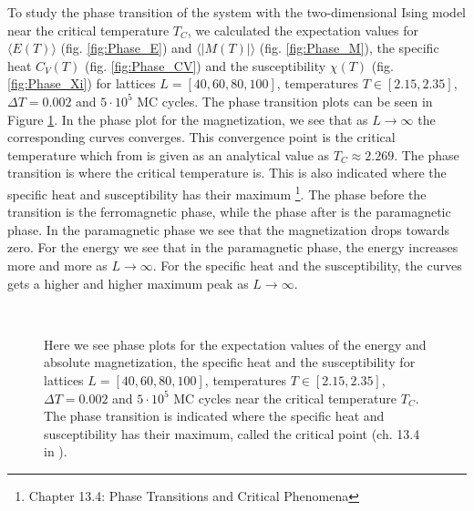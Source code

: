 \documentclass[12pt,a4paper,english]{article}
\begin{document}
To study the phase transition of the system with the two-dimensional Ising model near the critical temperature $T_C$, we calculated the expectation values for $\langle E(T)\rangle$ (fig. \ref{fig:Phase_E}) and $\langle |M(T)|\rangle$ (fig. \ref{fig:Phase_M}), the specific heat $C_V(T)$ (fig. \ref{fig:Phase_CV}) and the susceptibility $\chi(T)$ (fig. \ref{fig:Phase_Xi}) for lattices $L=[40,60,80,100]$, temperatures $T\in[2.15,2.35]$, $\Delta T=0.002$ and $5\cdot10^5$ MC cycles. The phase transition plots can be seen in Figure \ref{fig:Phases}. In the phase plot for the magnetization, we see that as $L\rightarrow\infty$ the corresponding curves converges. This convergence point is the critical temperature which from \citet{PhysRev.65.117} is given as an analytical value as $T_C\approx2.269$. The phase transition is where the critical temperature is. This is also indicated where the specific heat and susceptibility has their maximum \cite{ComPhys}\footnote{Chapter 13.4: Phase Transitions and Critical Phenomena}. The phase before the transition is the ferromagnetic phase, while the phase after is the paramagnetic phase. In the paramagnetic phase we see that the magnetization drops towards zero. For the energy we see that in the paramagnetic phase, the energy increases more and more as $L\rightarrow\infty$. For the specific heat and the susceptibility, the curves gets a higher and higher maximum peak as $L\rightarrow\infty$.

\begin{figure}[htbp]
	\hspace{0.5em}
	\\
	\hspace{0.5em}
	\caption{Here we see phase plots for the expectation values of the energy and absolute magnetization, the specific heat and the susceptibility for lattices $L=[40,60,80,100]$, temperatures $T\in[2.15,2.35]$, $\Delta T=0.002$ and $5\cdot10^5$ MC cycles near the critical temperature $T_C$. The phase transition is indicated where the specific heat and susceptibility has their maximum, called the critical point (ch. 13.4 in \citet{ComPhys}).\label{fig:Phases}}
\end{figure}
\end{document}
